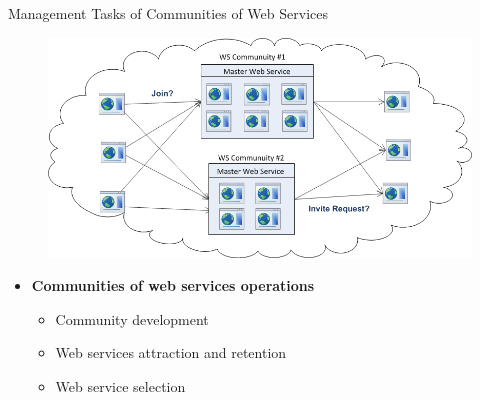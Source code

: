 \documentclass{beamer}
\begin{document}
\begin{frame}{Management Tasks of Communities of Web Services}

    \begin{figure}[htbp]
        \centering
        \includegraphics[width=0.85 \columnwidth]{figures/community_tasks.png}
    \end{figure}

    \begin{itemize}
        \itemsep=.35cm
    	\item \textbf{Communities of web services operations}
        \begin{itemize}
          \item Community development
          \item Web services attraction and retention
          \item Web service selection
        \end{itemize}                      	      	
    \end{itemize}
\end{frame}
\end{document}
